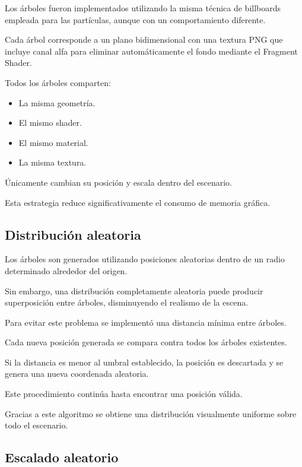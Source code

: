 Los árboles fueron implementados utilizando la misma técnica de billboards empleada para las partículas, aunque con un comportamiento diferente.

Cada árbol corresponde a un plano bidimensional con una textura PNG que incluye canal alfa para eliminar automáticamente el fondo mediante el Fragment Shader.

Todos los árboles comparten:

\begin{itemize}

\item La misma geometría.

\item El mismo shader.

\item El mismo material.

\item La misma textura.

\end{itemize}

Únicamente cambian su posición y escala dentro del escenario.

Esta estrategia reduce significativamente el consumo de memoria gráfica.


\subsection{Distribución aleatoria}

Los árboles son generados utilizando posiciones aleatorias dentro de un radio determinado alrededor del origen.

Sin embargo, una distribución completamente aleatoria puede producir superposición entre árboles, disminuyendo el realismo de la escena.

Para evitar este problema se implementó una distancia mínima entre árboles.

Cada nueva posición generada se compara contra todos los árboles existentes.

Si la distancia es menor al umbral establecido, la posición es descartada y se genera una nueva coordenada aleatoria.

Este procedimiento continúa hasta encontrar una posición válida.

Gracias a este algoritmo se obtiene una distribución visualmente uniforme sobre todo el escenario.

\subsection{Escalado aleatorio}

